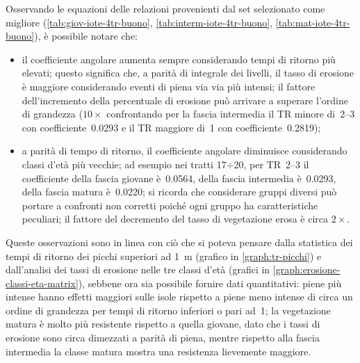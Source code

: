 Osservando le equazioni delle relazioni provenienti dal set selezionato come migliore (\cref{tab:giov-iote-4tr-buono}, \cref{tab:interm-iote-4tr-buono}, \cref{tab:mat-iote-4tr-buono}), è possibile notare che:
%
\begin{itemize}
	\item il coefficiente angolare aumenta sempre considerando tempi di ritorno più elevati;
	questo significa che, a parità di integrale dei livelli, il tasso di erosione è maggiore considerando eventi di piena via via più intensi;
	il fattore dell'incremento della percentuale di erosione può arrivare a superare l'ordine di grandezza ($10\times$ confrontando per la fascia intermedia il TR minore di~\SIrange[range-phrase = {-}, range-units = single]{2}{3}{\mesi} con coefficiente~\num{0.0293} e il TR maggiore di~\SI{1}{\anno} con coefficiente~\num{0.2819});
	\item a parità di tempo di ritorno, il coefficiente angolare diminuisce considerando classi d'età più vecchie; ad esempio nei tratti 17$\div$20, per TR~\SIrange[range-phrase = {-}, range-units = single]{2}{3}{\mesi} il coefficiente della fascia giovane è~\num{0.0564}, della fascia intermedia è~\num{0.0293}, della fascia matura è~\num{0.0220};
	si ricorda che considerare gruppi diversi può portare a confronti non corretti poiché ogni gruppo ha caratteristiche peculiari;
	il fattore del decremento del tasso di vegetazione erosa è circa $2 \times$.
\end{itemize}
%
Queste osservazioni sono in linea con ciò che si poteva pensare dalla statistica dei tempi di ritorno dei picchi superiori ad \SI{1}{\m} (grafico in \cref{graph:tr-picchi}) e dall'analisi dei tassi di erosione nelle tre classi d'età (grafici in \cref{graph:erosione-classi-eta-matrix}), sebbene ora sia possibile fornire dati quantitativi:
piene più intense hanno effetti maggiori sulle isole rispetto a piene meno intense di circa un ordine di grandezza per tempi di ritorno inferiori o pari ad~\SI{1}{\anno};
la vegetazione matura è molto più resistente rispetto a quella giovane, dato che i tassi di erosione sono circa dimezzati a parità di piena, mentre rispetto alla fascia intermedia la classe matura mostra una resistenza lievemente maggiore.

